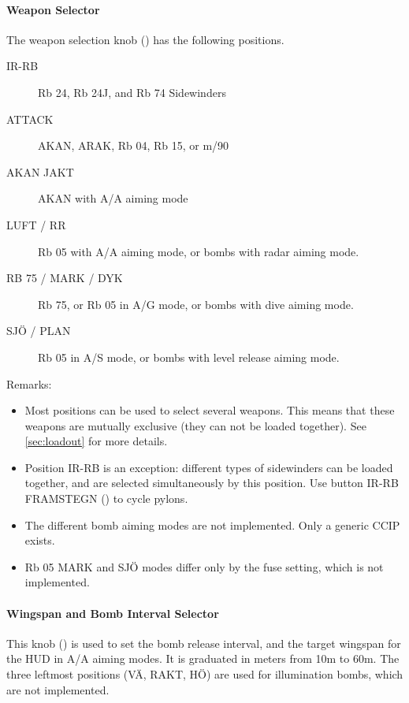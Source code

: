 \documentclass[a4paper]{report}
\begin{document}
{\paragraph{Weapon Selector}
The weapon selection knob () has the following positions.
\begin{description}
  \item[IR-RB] Rb 24, Rb 24J, and Rb 74 Sidewinders
  \item[ATTACK] AKAN, ARAK, Rb 04, Rb 15, or m/90
  \item[AKAN JAKT] AKAN with A/A aiming mode
  \item[LUFT / RR] Rb 05 with A/A aiming mode, or bombs with radar aiming mode.
  \item[RB 75 / MARK / DYK] Rb 75, or Rb 05 in A/G mode, or bombs with dive aiming mode.
  \item[SJÖ / PLAN] Rb 05 in A/S mode, or bombs with level release aiming mode.
\end{description}

Remarks:
\begin{itemize}
  \item Most positions can be used to select several weapons.
    This means that these weapons are mutually exclusive (they can not be loaded together).
    See \cref{sec:loadout} for more details.
  \item Position IR-RB is an exception: different types of sidewinders can be loaded together,
    and are selected simultaneously by this position.
    Use button IR-RB FRAMSTEGN () to cycle pylons.
  \item The different bomb aiming modes are not implemented. Only a generic CCIP exists.
  \item Rb 05 MARK and SJÖ modes differ only by the fuse setting, which is not implemented.
\end{itemize}

\paragraph{Wingspan and Bomb Interval Selector}
This knob () is used to set the bomb release interval,
and the target wingspan for the HUD in A/A aiming modes. It is graduated in meters from 10m to 60m.
The three leftmost positions (VÄ, RAKT, HÖ) are used for illumination bombs, which are not implemented.

}
\end{document}
